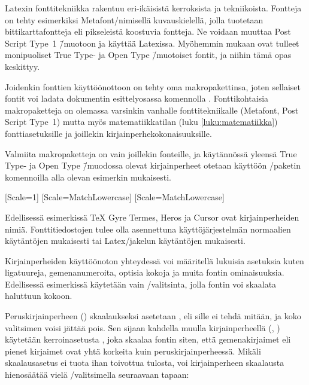 
Latexin fonttitekniikka rakentuu eri-ikäisistä kerroksista ja
tekniikoista. Fontteja on tehty esimerkiksi Metafont\-/nimisellä
kuvauskielellä, jolla tuotetaan bittikarttafontteja eli pikseleistä
koostuvia fontteja. Ne voidaan muuttaa Post Script Type~1 \=/muotoon ja
käyttää Latexissa. Myöhemmin mukaan ovat tulleet monipuoliset True Type-
ja Open Type \=/muotoiset fontit, ja niihin tämä opas keskittyy.

Joidenkin fonttien käyttöönottoon on tehty oma makropakettinsa, joten
sellaiset fontit voi ladata dokumentin esittelyosassa komennolla
. Fonttikohtaisia makropaketteja on olemassa
varsinkin vanhalle fonttitekniikalle (Metafont, Post Script Type~1)
mutta myös matematiikkatilan (luku \ref{luku:matematiikka})
fonttiasetuksille ja joillekin kir\-jain\-perhe\-koko\-nai\-suuk\-sille.

Valmiita makropaketteja on vain joillekin fonteille, ja käytännössä
yleensä True Type- ja Open Type \=/muodossa olevat kirjainperheet
otetaan käyttöön \-/paketin komennoilla alla olevan
esimerkin mukaisesti.

\begin{koodilohkosis}
  \setmainfont{TeX Gyre Termes}[Scale=1]
  \setsansfont{TeX Gyre Heros} [Scale=MatchLowercase]
  \setmonofont{TeX Gyre Cursor}[Scale=MatchLowercase]
\end{koodilohkosis}

Edellisessä esimerkissä TeX Gyre Termes, Heros ja Cursor ovat
kirjainperheiden nimiä. Fonttitiedostojen tulee olla asennettuna
käyttöjärjestelmän normaalien käytäntöjen mukaisesti tai Latex\-/jakelun
käytäntöjen mukaisesti.

Kirjainperheiden käyttöönoton yhteydessä voi määritellä lukuisia
asetuksia kuten ligatuureja, gemenanumeroita, optisia kokoja ja muita
fontin ominaisuuksia. Edellisessä esimerkissä käytetään vain
\-/valitsinta, jolla fontin voi skaalata haluttuun kokoon.

Peruskirjainperheen () skaalaukseksi
asetetaan , eli sille ei tehdä mitään, ja koko valitsimen
voisi jättää pois. Sen sijaan kahdella muulla kirjainperheellä
(, ) käytetään
ker\-roin\-ase\-tus\-ta , joka skaalaa fontin
siten, että gemenakirjaimet eli pienet kirjaimet ovat yhtä korkeita kuin
peruskirjainperheessä. Mikäli skaa\-laus\-ase\-tus
 ei tuota ihan toivottua tulosta, voi
kirjainperheen skaalausta hienosäätää vielä
\-/valitsimella seuraavaan tapaan:

